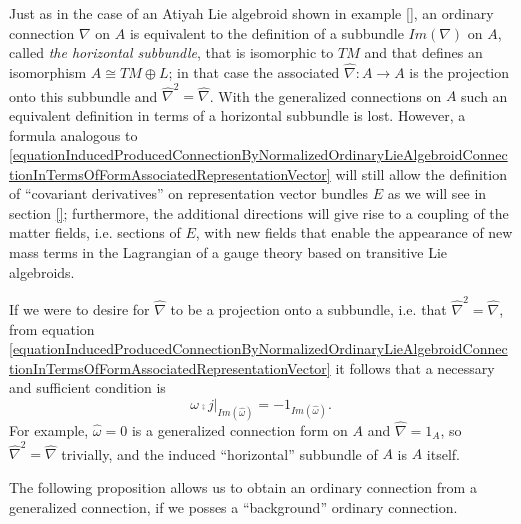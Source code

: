 \begin{remark}
Just as in the case of an Atiyah Lie algebroid shown in example \ref{}, an ordinary connection $\nabla$ on $A$ is equivalent to the definition of a subbundle $Im(\nabla)$ on $A$, called \emph{the horizontal subbundle}, that is isomorphic to $TM$ and that defines an isomorphism $A \cong TM \oplus L$; in that case the associated $\hat \nabla: A \to A$ is the projection onto this subbundle and $\hat \nabla^2 = \hat \nabla$. With the generalized connections on $A$ such an equivalent definition in terms of a horizontal subbundle is lost. However, a formula analogous to \eqref{equationInducedProducedConnectionByNormalizedOrdinaryLieAlgebroidConnectionInTermsOfFormAssociatedRepresentationVector} will still allow the definition of ``covariant derivatives'' on representation vector bundles $E$ as we will see in section \ref{}; furthermore, the additional directions will give rise to a coupling of the matter fields, i.e. sections of $E$, with new fields that enable the appearance of new mass terms in the Lagrangian of a gauge theory based on transitive Lie algebroids.

If we were to desire for $\hat \nabla$ to be a projection onto a subbundle, i.e. that $\hat \nabla^2 = \hat \nabla$, from equation \eqref{equationInducedProducedConnectionByNormalizedOrdinaryLieAlgebroidConnectionInTermsOfFormAssociatedRepresentationVector} it follows that a necessary and sufficient condition is 
\begin{equation}\label{equationEquivalentNecessarySufficientGeneralizedConnectionBeDefineHorizontalProjectionSubbundle}
    \omega \comp j|_{Im(\hat \omega)} = - 1_{Im(\hat \omega)}.
\end{equation}
For example, $\hat \omega = 0$ is a generalized connection form on $A$ and $\hat \nabla = 1_A$, so $\hat \nabla^2 = \hat \nabla$ trivially, and the induced ``horizontal'' subbundle of $A$ is $A$ itself.
\end{remark}

The following proposition allows us to obtain an ordinary connection from a generalized connection, if we posses a ``background'' ordinary connection.

